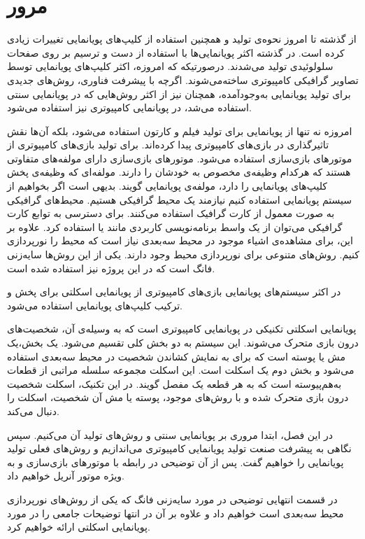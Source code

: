 \chapter { مرور }

از گذشته تا امروز نحوه‌ی تولید و همچنین استفاده از کلیپ‌های پویانمایی تغییرات زیادی کرده است.
در گذشته اکثر پویانمایی‌ها با استفاده از دست و ترسیم بر روی صفحات سلولوئیدی تولید می‌شدند.
درصورتیکه که امروزه، اکثر کلیپ‌های پویانمایی توسط تصاویر گرافیکی کامپیوتری ساخته‌می‌شوند.
اگرچه با پیشرفت فناوری، روش‌های جدیدی برای تولید پویانمایی به‌وجودآمده، همچنان نیز از اکثر روش‌هایی که در 
پویانمایی سنتی استفاده می‌شد، در پویانمایی کامپیوتری نیز استفاده می‌شود.

امروزه نه تنها از پویانمایی برای تولید فیلم و کارتون استفاده می‌شود، بلکه آن‌ها نقش 
تاثیرگذاری در بازی‌های کامپیوتری پیدا کرده‌اند.
برای تولید بازی‌های کامپیوتری از موتور‌های بازی‌سازی استفاده می‌شود.
موتور‌های بازی‌سازی دارای مولفه‌های متفاوتی هستند که هرکدام وظیفه‌ی مخصوص به خودشان را دارند.
مولفه‌ای که وظیفه‌ی پخش کلیپ‌های پویانمایی را دارد، مولفه‌ی پویانمایی گویند.
بدیهی است اگر بخواهیم از سیستم پویانمایی استفاده کنیم نیازمند یک محیط گرافیکی هستیم.
محیط‌های گرافیکی به صورت معمول از کارت گرافیک استفاده می‌کنند. برای دسترسی به توابع 
کارت گرافیکی می‌توان از یک واسط برنامه‌نویسی کاربردی مانند 
یا
استفاده کرد.
علاوه بر این، برای مشاهده‌ی اشیاء موجود در محیط سه‌بعدی نیاز است که محیط را نورپردازی کنیم.
روش‌های متنوعی برای نورپردازی محیط وجود دارند. یکی از این روش‌ها 
سایه‌زنی فانگ
است که در این پروژه نیز استفاده شده است.

در اکثر سیستم‌های پویانمایی بازی‌های کامپیوتری از پویانمایی اسکلتی برای پخش و ترکیب کلیپ‌های پویانمایی 
استفاده می‌شود.

پویانمایی اسکلتی تکنیکی در پویانمایی کامپیوتری است که به وسیله‌ی آن، شخصیت‌های درون بازی متحرک می‌شوند. 
این سیستم به دو بخش کلی تقسیم می‌شود.
یک بخش،یک مش یا پوسته است که برای به نمایش کشاندن شخصیت در محیط سه‌بعدی استفاده می‌شود و بخش دوم یک اسکلت است. این اسکلت مجموعه سلسله مراتبی از قطعات به‌‌هم‌پیوسته است که به هر قطعه یک مفصل گویند.
در این تکنیک، اسکلت شخصیت درون بازی متحرک شده و با روش‌های موجود، پوسته یا مش آن شخصیت، اسکلت را دنبال می‌کند.


در این فصل، ابتدا مروری بر پویانمایی سنتی و روش‌های تولید آن می‌کنیم. سپس نگاهی به 
پیشرفت صنعت تولید پویانمایی کامپیوتری می‌اندازیم و روش‌های فعلی تولید پویانمایی را خواهیم گفت.
پس از آن توضیحی در رابطه با موتور‌های بازی‌سازی و به ویژه موتور آنریل خواهیم داد.

در قسمت انتهایی توضیحی در مورد 
سایه‌زنی فانگ
که یکی از روش‌های نورپردازی محیط سه‌بعدی است خواهیم داد و علاوه بر آن
در انتها توضیحات جامعی را در مورد پویانمایی اسکلتی ارائه خواهیم کرد.

